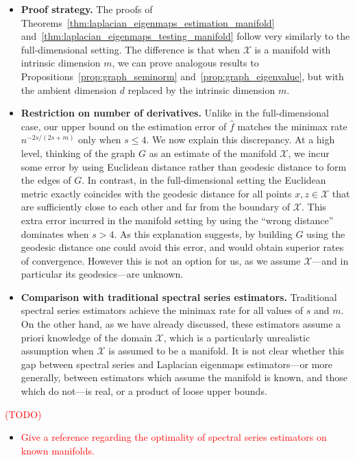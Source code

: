 \documentclass{article}
\newcommand{\1}{\mathbf{1}}
\newcommand{\mc}[1]{\mathcal{#1}}
\newcommand{\wh}[1]{\widehat{#1}}
\theoremstyle{alden}
\theoremstyle{aldenthm}
\theoremstyle{definition}
\theoremstyle{remark}
\begin{document}
\begin{itemize}
	\item \textbf{Proof strategy.} The proofs of Theorems~\ref{thm:laplacian_eigenmaps_estimation_manifold} and~\ref{thm:laplacian_eigenmaps_testing_manifold} follow very similarly to the full-dimensional setting. The difference is that when $\mc{X}$ is a manifold with intrinsic dimension $m$, we can prove analogous results to Propositions~\ref{prop:graph_seminorm} and~\ref{prop:graph_eigenvalue}, but with the ambient dimension $d$ replaced by the intrinsic dimension $m$. 
	\item \textbf{Restriction on number of derivatives.} Unlike in the full-dimensional case, our upper bound on the estimation error of $\wh{f}$ matches the minimax rate $n^{-2s/(2s + m)}$ only when $s \leq 4$. We now explain this discrepancy. At a high level, thinking of the graph $G$ as an estimate of the manifold $\mc{X}$, we incur some error by using Euclidean distance rather than geodesic distance to form the edges of $G$. In contrast, in the full-dimensional setting the Euclidean metric exactly coincides with the geodesic distance for all points $x,z \in \mc{X}$ that are sufficiently close to each other and far from the boundary of $\mc{X}$. This extra error incurred in the manifold setting by using the ``wrong distance'' dominates when $s > 4$. As this explanation suggests, by building $G$ using the geodesic distance one could avoid this error, and would obtain superior rates of convergence. However this is not an option for us, as we assume $\mc{X}$---and in particular its geodesics---are unknown.
	\item \textbf{Comparison with traditional spectral series estimators.} Traditional spectral series estimators achieve the minimax rate for all values of $s$ and $m$. On the other hand, as we have already discussed, these estimators assume a priori knowledge of the domain $\mc{X}$, which is a particularly unrealistic assumption when $\mc{X}$ is assumed to be a manifold. It is not clear whether this gap between spectral series and Laplacian eigenmaps estimators---or more generally, between estimators which assume the manifold is known, and those which do not---is real, or a product of loose upper bounds. 
\end{itemize}

\textcolor{red}{(TODO)}
\begin{itemize}
	\item \textcolor{red}{Give a reference regarding the optimality of spectral series estimators on known manifolds.}
\end{itemize}
\end{document}
